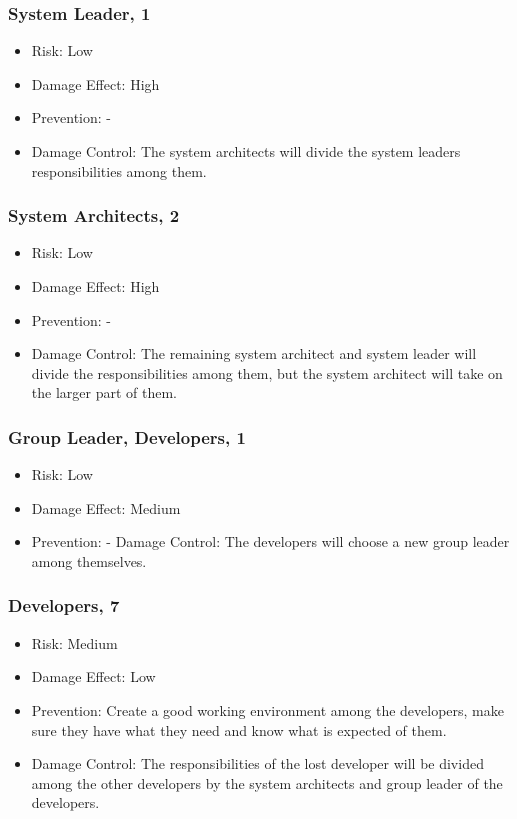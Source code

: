 \documentclass[a4paper]{article}
\begin{document}
\subsubsection{System Leader, 1}
\begin{itemize}
\item Risk: Low
\item Damage Effect: High
\item Prevention: -
\item Damage Control: The system architects will divide the system leaders responsibilities among them.
\end{itemize}

\subsubsection{System Architects, 2}
\begin{itemize}
\item Risk: Low
\item Damage Effect: High
\item Prevention: -
\item Damage Control: The remaining system architect and system leader will divide the responsibilities among them, but the system architect will take on the larger part of them.
\end{itemize}

\subsubsection{Group Leader, Developers, 1}
\begin{itemize}
\item Risk: Low
\item Damage Effect: Medium
\item Prevention: -
Damage Control: The developers will choose a new group leader among themselves.
\end{itemize}

\subsubsection{Developers, 7}
\begin{itemize}
\item Risk: Medium
\item Damage Effect: Low
\item Prevention: Create a good working environment among the developers, make sure they have what they need and know what is expected of them.
\item Damage Control: The responsibilities of the lost developer will be divided among the other developers by the system architects and group leader of the developers.
\end{itemize}
\end{document}
